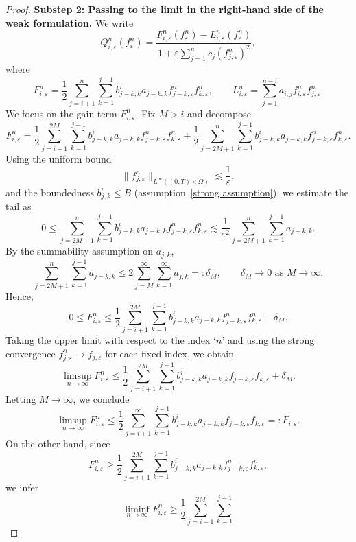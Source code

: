 \documentclass[a4paper,12pt,reqno]{amsart}
\theoremstyle{plain}
\numberwithin{equation}{section}
\begin{document}
\begin{proof}
		
		\textbf{Substep 2: Passing to the limit in the right-hand side of the weak formulation.} We write
		\[
		Q_{i,\varepsilon}^n(f_{\varepsilon}^n)
		=
		\frac{F_{i,\varepsilon}^n(f_{\varepsilon}^n)-L_{i,\varepsilon}^n(f_{\varepsilon}^n)}
		{1+\varepsilon\displaystyle\sum_{j=1}^{n} c_j (f_{j,\varepsilon}^n)^2},
		\]
		where
		\[
		F_{i,\varepsilon}^n
		=
		\frac12\sum_{j=i+1}^{n}\sum_{k=1}^{j-1}
		b_{j-k,k}^i a_{j-k,k}
		f_{j-k,\varepsilon}^n f_{k,\varepsilon}^n,
		\qquad
		L_{i,\varepsilon}^n
		=
		\sum_{j=1}^{n-i} a_{i,j} f_{i,\varepsilon}^n f_{j,\varepsilon}^n.
		\]
		We focus on the gain term \(F_{i,\varepsilon}^n\).
		Fix \(M>i\) and decompose
		\[
		F_{i,\varepsilon}^n
		=
		\frac12\sum_{j=i+1}^{2M}\sum_{k=1}^{j-1}
		b_{j-k,k}^i a_{j-k,k}
		f_{j-k,\varepsilon}^n f_{k,\varepsilon}^n
		+
		\frac12\sum_{j=2M+1}^{n}\sum_{k=1}^{j-1}
		b_{j-k,k}^i a_{j-k,k}
		f_{j-k,\varepsilon}^n f_{k,\varepsilon}^n.
		\]
		Using the uniform bound
		\[
		\|f_{j,\varepsilon}^n\|_{L^\infty((0,T)\times\Omega)}
		\lesssim \frac{1}{\varepsilon},
		\]
		and the boundedness \(b_{j,k}^i\le B\) (assumption~\eqref{strong assumption}), we estimate the tail as
		\[
		0 \le
		\sum_{j=2M+1}^{n}\sum_{k=1}^{j-1}
		b_{j-k,k}^i a_{j-k,k}
		f_{j-k,\varepsilon}^n f_{k,\varepsilon}^n
		\lesssim
		\frac{1}{\varepsilon^2}
		\sum_{j=2M+1}^{n}\sum_{k=1}^{j-1} a_{j-k,k}.
		\]
		By the summability assumption on \(a_{j,k}\),
		\[
		\sum_{j=2M+1}^{n}\sum_{k=1}^{j-1} a_{j-k,k}
		\le
		2\sum_{j=M}^{\infty}\sum_{k=1}^{\infty} a_{j,k}
		=: \delta_M,
		\qquad \delta_M \to 0 \text{ as } M\to\infty.
		\]
		Hence,
		\[
		0 \le F_{i,\varepsilon}^n
		\le
		\frac12\sum_{j=i+1}^{2M}\sum_{k=1}^{j-1}
		b_{j-k,k}^i a_{j-k,k}
		f_{j-k,\varepsilon}^n f_{k,\varepsilon}^n
		+ \delta_M.
		\]
		Taking the upper limit with respect to the index `$n$' and using the strong convergence
		\(f_{j,\varepsilon}^n \to f_{j,\varepsilon}\) for each fixed index, we obtain
		\[
		\limsup_{n\to\infty} F_{i,\varepsilon}^n
		\le
		\frac12\sum_{j=i+1}^{2M}\sum_{k=1}^{j-1}
		b_{j-k,k}^i a_{j-k,k}
		f_{j-k,\varepsilon} f_{k,\varepsilon}
		+ \delta_M.
		\]
		Letting \(M\to\infty\), we conclude
		\[
		\limsup_{n\to\infty} F_{i,\varepsilon}^n
		\le
		\frac12\sum_{j=i+1}^{\infty}\sum_{k=1}^{j-1}
		b_{j-k,k}^i a_{j-k,k}
		f_{j-k,\varepsilon} f_{k,\varepsilon}
		=: F_{i,\varepsilon}.
		\]
		On the other hand, since
		\[
		F_{i,\varepsilon}^n
		\ge
		\frac12\sum_{j=i+1}^{2M}\sum_{k=1}^{j-1}
		b_{j-k,k}^i a_{j-k,k}
		f_{j-k,\varepsilon}^n f_{k,\varepsilon}^n,
		\]
		we infer
		\[
		\liminf_{n\to\infty} F_{i,\varepsilon}^n
		\ge
		\frac12\sum_{j=i+1}^{2M}\sum_{k=1}^{j-1}
\]
\end{proof}
\end{document}

